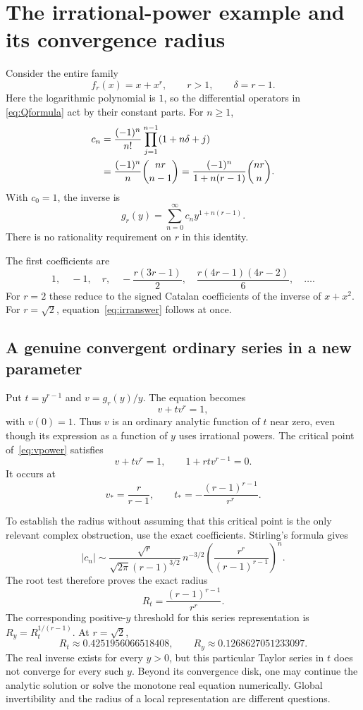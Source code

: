 \documentclass[11pt,a4paper]{article}
\numberwithin{equation}{section}
\theoremstyle{definition}
\theoremstyle{remark}
\begin{document}
\section{The irrational-power example and its convergence radius}
\label{sec:irrexpansion}

Consider the entire family
\[
 f_r(x)=x+x^r,\qquad r>1,\qquad \delta=r-1.
\]
Here the logarithmic polynomial is $1$, so the differential operators in
\eqref{eq:Qformula} act by their constant parts. For $n\ge1$,
\begin{align}\label{eq:fuss}
 c_n
 &=\frac{(-1)^n}{n!}\prod_{j=1}^{n-1}(1+n\delta+j)\notag\\
 &=\frac{(-1)^n}{n}\binom{nr}{n-1}
 =\frac{(-1)^n}{1+n(r-1)}\binom{nr}{n}.
\end{align}
With $c_0=1$, the inverse is
\begin{equation}\label{eq:irrall}
 g_r(y)=\sum_{n=0}^{\infty}c_n y^{1+n(r-1)}.
\end{equation}
There is no rationality requirement on $r$ in this identity.

The first coefficients are
\[
 1,\quad -1,\quad r,\quad-\frac{r(3r-1)}2,
 \quad\frac{r(4r-1)(4r-2)}6,\quad\ldots.
\]
For $r=2$ these reduce to the signed Catalan coefficients of the inverse
of $x+x^2$. For $r=\sqrt2$, equation~\eqref{eq:irranswer} follows at once.

\subsection{A genuine convergent ordinary series in a new parameter}

Put $t=y^{r-1}$ and $v=g_r(y)/y$. The equation becomes
\begin{equation}\label{eq:vpower}
 v+t v^r=1,
\end{equation}
with $v(0)=1$. Thus $v$ is an ordinary analytic function of $t$ near zero,
even though its expression as a function of $y$ uses irrational powers.
The critical point of~\eqref{eq:vpower} satisfies
\[
 v+t v^r=1,\qquad 1+r t v^{r-1}=0.
\]
It occurs at
\[
 v_* =\frac r{r-1},\qquad
 t_*=-\frac{(r-1)^{r-1}}{r^r}.
\]

To establish the radius without assuming that this critical point is the
only relevant complex obstruction, use the exact coefficients. Stirling's
formula gives
\begin{equation}\label{eq:cnstirling}
 |c_n|\sim
 \frac{\sqrt r}{\sqrt{2\pi}(r-1)^{3/2}}\,
 n^{-3/2}\left(\frac{r^r}{(r-1)^{r-1}}\right)^n.
\end{equation}
The root test therefore proves the exact radius
\begin{equation}\label{eq:radius}
 R_t=\frac{(r-1)^{r-1}}{r^r}.
\end{equation}
The corresponding positive-$y$ threshold for this series representation is
$R_y=R_t^{1/(r-1)}$. At $r=\sqrt2$,
\[
 R_t\approx0.4251956066518408,\qquad
 R_y\approx0.1268627051233097.
\]
The real inverse exists for every $y>0$, but this particular Taylor series
in $t$ does not converge for every such $y$. Beyond its convergence disk,
one may continue the analytic solution or solve the monotone real equation
numerically. Global invertibility and the radius of a local representation
are different questions.
\end{document}
